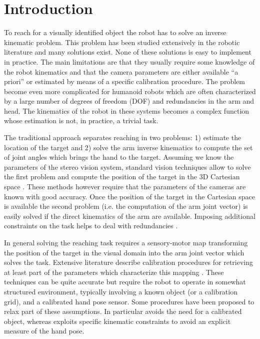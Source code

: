 \section{Introduction}
To reach for a visually identified object the robot has to solve
an inverse kinematic problem. This problem has been studied 
extensively in the robotic literature 
and many solutions exist. None of these solutions is easy to 
implement in practice. The main limitations are that they usually require 
some knowledge of the robot kinematics and that the camera parameters 
are either available ``a priori'' or estimated by means of a specific
calibration procedure. The problem become even more complicated 
for humanoid robots which are often characterized by 
a large number of degrees of freedom (DOF) and redundancies in the 
arm and head. The kinematics of the robot in these systems becomes a 
complex function whose estimation is not, in practice, a trivial task.

The traditional approach separates reaching in two
problems: 1) estimate the location of the target and
2) solve the arm inverse kinematics to compute the set of joint
angles which brings the hand to the target. Assuming we know the 
parameters of the stereo vision system, standard vision techniques
allow to solve the first problem and compute the position of the 
target in the 3D Cartesian space \cite{Soatto03vision}. These methods 
however require that the parameters of the cameras are known with 
good accuracy. Once the 
position of the target in the Cartesian space is available 
the second problem (i.e. the computation of the arm joint vector) is 
easily solved if the direct kinematics of the arm are available. 
Imposing additional constraints on the task helps to deal with 
redundancies \cite{liegeois77automatic}.

In general solving the reaching task requires a sensory-motor map
transforming the position of the target in the visual domain into the 
arm joint vector which solves the task. Extensive literature describe 
calibration procedures for retrieving at least part of the parameters 
which characterize this mapping 
\cite{Hollerbach96calibration,Tsai88Calibration}. 
These techniques can be quite accurate but require the robot to operate
in somewhat structured environment, typically involving a known object (or
a calibration grid), and a calibrated hand pose sensor. Some procedures 
have been proposed to relax part of these assumptions. In particular 
\cite{AHE01} avoids the need for a calibrated object, whereas 
\cite{Bennett91calibration} exploits specific kinematic constraints 
to avoid an explicit measure of the hand pose.

